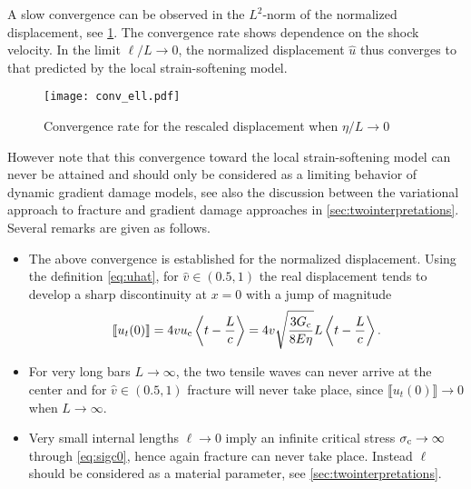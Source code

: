 A slow convergence can be observed in the $L^2$-norm of the normalized displacement, see \cref{fig:conv_ell}. The convergence rate shows dependence on the shock velocity. In the limit $\ell/L\to 0$, the normalized displacement $\widehat{u}$ thus converges to that predicted by the local strain-softening model.
\begin{figure}[htbp]
\centering
\texttt{[image: conv\_ell.pdf]}
\caption{Convergence rate for the rescaled displacement when $\eta/L\to 0$} \label{fig:conv_ell}
\end{figure}

However note that this convergence toward the local strain-softening model can never be attained and should only be considered as a limiting behavior of dynamic gradient damage models, see also the discussion between the variational approach to fracture and gradient damage approaches in \cref{sec:twointerpretations}. Several remarks are given as follows.
\begin{itemize}
\item The above convergence is established for the normalized displacement. Using the definition \eqref{eq:uhat}, for $\widehat{v}\in(0.5,1)$ the real displacement tends to develop a sharp discontinuity at $x=0$ with a jump of magnitude
\[
\llbracket u_t(0)\rrbracket=4vu_{\mathrm{c}}\Braket{t-\frac{L}{c}}=4v\sqrt{\frac{3G_\mathrm{c}}{8E\eta}}L\Braket{t-\frac{L}{c}}.
\]

\item For very long bars $L\to\infty$, the two tensile waves can never arrive at the center and for $\widehat{v}\in(0.5,1)$ fracture will never take place, since $\llbracket u_t(0)\rrbracket\to 0$ when $L\to \infty$.

\item Very small internal lengths $\ell\to 0$ imply an infinite critical stress $\sigma_{\mathrm{c}}\to\infty$ through \eqref{eq:sigc0}, hence again fracture can never take place. Instead $\ell$ should be considered as a material parameter, see \cref{sec:twointerpretations}.
\end{itemize}

